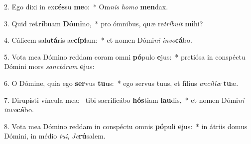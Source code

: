 2. Ego dixi in ex\textbf{cés}su \textbf{me}o:~*  Om\textit{nis} \textit{ho}\textit{mo} \textbf{men}dax.\

3. Quid re\textbf{trí}buam \textbf{Dó}\textbf{mi}no,~*  pro ómnibus, quæ re\textit{trí}\textit{bu}\textit{it} \textbf{mi}hi?\

4. Cálicem salu\textbf{tá}ris ac\textbf{cí}\textbf{pi}am:~*  et nomen Dómi\textit{ni} \textit{in}\textit{vo}\textbf{cá}bo.\

5. Vota mea Dómino reddam coram omni \textbf{pó}pulo \textbf{e}jus:~*  pretiósa in conspéctu Dómini mors \textit{sanc}\textit{tó}\textit{rum} \textbf{e}jus:\

6. O Dómine, quia ego \textbf{ser}vus \textbf{tu}us:~*  ego servus tuus, et fílius \textit{an}\textit{cíl}\textit{læ} \textbf{tu}æ.\

7. Dirupísti víncula mea: \dag\  tibi sacrificábo \textbf{hós}tiam \textbf{lau}dis,~*  et nomen Dómi\textit{ni} \textit{in}\textit{vo}\textbf{cá}bo.\

8. Vota mea Dómino reddam in conspéctu omnis \textbf{pó}puli \textbf{e}jus:~*  in átriis domus Dómini, in médio \textit{tu}\textit{i}, \textit{Je}\textbf{rú}salem.\

